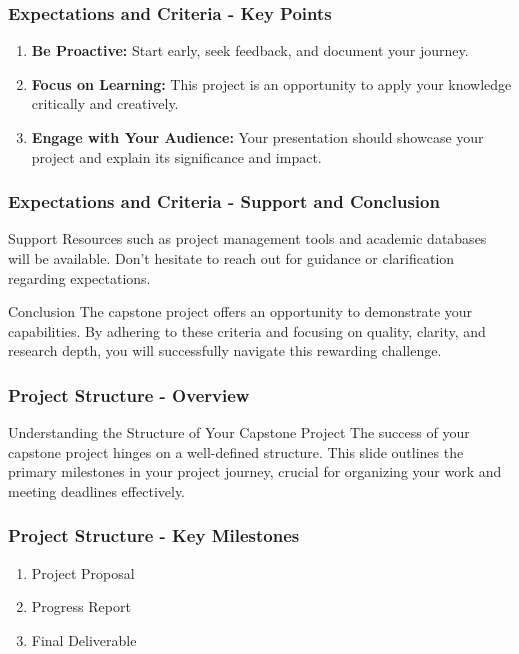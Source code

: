 \documentclass[aspectratio=169]{beamer}
\begin{document}
\begin{frame}[fragile]
    \frametitle{Expectations and Criteria - Key Points}
    \begin{enumerate}
        \item \textbf{Be Proactive:} Start early, seek feedback, and document your journey.
        \item \textbf{Focus on Learning:} This project is an opportunity to apply your knowledge critically and creatively.
        \item \textbf{Engage with Your Audience:} Your presentation should showcase your project and explain its significance and impact.
    \end{enumerate}
\end{frame}

\begin{frame}[fragile]
    \frametitle{Expectations and Criteria - Support and Conclusion}
    \begin{block}{Support}
        Resources such as project management tools and academic databases will be available. Don't hesitate to reach out for guidance or clarification regarding expectations.
    \end{block}
    
    \begin{block}{Conclusion}
        The capstone project offers an opportunity to demonstrate your capabilities. By adhering to these criteria and focusing on quality, clarity, and research depth, you will successfully navigate this rewarding challenge.
    \end{block}
\end{frame}

\begin{frame}[fragile]
    \frametitle{Project Structure - Overview}
    \begin{block}{Understanding the Structure of Your Capstone Project}
        The success of your capstone project hinges on a well-defined structure. This slide outlines the primary milestones in your project journey, crucial for organizing your work and meeting deadlines effectively.
    \end{block}
\end{frame}

\begin{frame}[fragile]
    \frametitle{Project Structure - Key Milestones}
    \begin{enumerate}
        \item Project Proposal
        \item Progress Report
        \item Final Deliverable
    \end{enumerate}
\end{frame}
\end{document}
